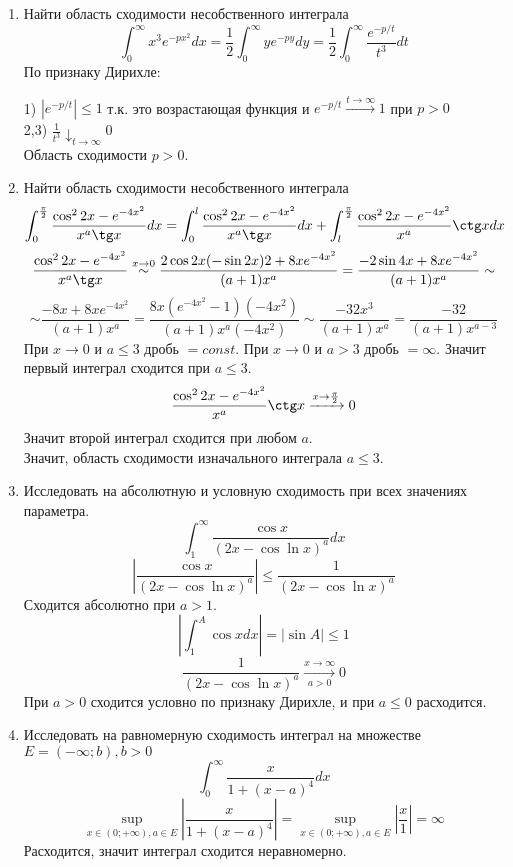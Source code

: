 \documentclass{article}
\begin{document}
\begin{large}
\begin{enumerate}
\item Найти область сходимости несобственного интеграла
$$ \int_0^\infty x^3 e^{-px^2} dx = \frac{1}{2} \int_0^\infty y e^{-py}dy = \frac{1}{2} \int_0^\infty \frac{e^{-p/t}}{t^3}dt$$
По признаку Дирихле:

1) $ \left| e^{-p/t} \right| \leq 1$ т.к. это возрастающая функция и $e^{-p/t} \xrightarrow{t \to \infty} 1$ при $p > 0$ \\
2,3) $ \frac{1}{t^3} \downarrow_{t\to\infty}0$\\
Область сходимости $p > 0$.

\item Найти область сходимости несобственного интеграла
$$ \int_0^{\frac{\pi}{2}} \frac{\cos^2 2x - e^{-4x^2}}{x^a \tg x} dx = \int_0^{l} \frac{\cos^2 2x - e^{-4x^2}}{x^a \tg x} dx + \int_l^{\frac{\pi}{2}} \frac{\cos^2 2x - e^{-4x^2}}{x^a} \ctg x dx $$
$$ \frac{\cos^2 2x - e^{-4x^2}}{x^a \tg x} \stackrel{x\to0}{\sim} \frac{2\cos 2x (-\sin 2x) 2 + 8x e^{-4x^2}}{(a+1)x^a} = \frac{-2\sin 4x +8x e^{-4x^2}}{(a+1)x^a} \sim $$
$$ \sim \frac{-8x + 8x e^{-4x^2}}{(a+1)x^a} = \frac{8x(e^{-4x^2} - 1)(-4x^2)}{(a+1)x^a(-4x^2)} \sim \frac{-32x^3}{(a+1)x^a} = \frac{-32}{(a+1)x^{a-3}} $$
При $x\to0$ и $a \leq 3$ дробь $= const$. При $x\to0$ и $a > 3$ дробь $= \infty$. Значит первый интеграл сходится при $a \leq 3$.
$$ \frac{\cos^2 2x - e^{-4x^2}}{x^a} \ctg x \xrightarrow{x\to \frac{\pi}{2}} 0 $$
Значит второй интеграл сходится при любом $a$. \\
Значит, область сходимости изначального интеграла $a \leq 3$.

\item Исследовать на абсолютную и условную сходимость при всех значениях параметра.
$$ \int_1^\infty \frac{\cos x}{(2x - \cos \ln x)^a} dx $$
$$ \left| \frac{\cos x}{(2x - \cos \ln x)^a} \right| \leq \frac{1}{(2x - \cos \ln x)^a} $$
Сходится абсолютно при $a > 1$.
$$ \left| \int_1^A \cos x dx \right| = | \sin A | \leq 1 $$
$$ \frac{1}{(2x - \cos \ln x)^a} \xrightarrow[a>0]{x\to\infty} 0 $$
При $a > 0$ сходится условно по признаку Дирихле, и при $a \leq 0$ расходится.

\item Исследовать на равномерную сходимость интеграл на множестве $ E = (-\infty; b), b>0$
$$ \int_0^\infty \frac{x}{1 + (x - a)^4} dx $$
$$ \sup_{x\in (0;+\infty), a \in E} \left| \frac{x}{1 + (x - a)^4} \right| = \sup_{x\in (0;+\infty), a \in E} \left| \frac{x}{1} \right| = \infty $$
Расходится, значит интеграл сходится неравномерно.


\end{enumerate}
\end{large}
\end{document}
